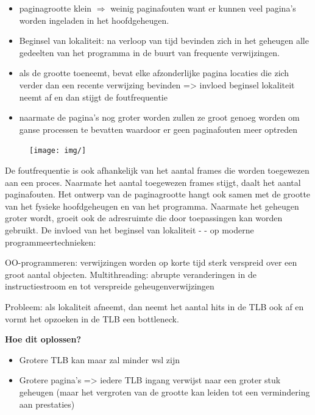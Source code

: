 \begin{itemize}
\item paginagrootte klein $\Rightarrow$ weinig paginafouten want er kunnen veel pagina's worden ingeladen in het hoofdgeheugen.
\item Beginsel van lokaliteit: na verloop van tijd bevinden zich in het geheugen alle gedeelten van het programma in de buurt van frequente verwijzingen.
\item als de grootte toeneemt, bevat elke afzonderlijke pagina locaties die zich verder dan een recente verwijzing bevinden => invloed beginsel lokaliteit neemt af en dan stijgt de foutfrequentie
\item naarmate de pagina's nog groter worden zullen ze groot genoeg worden om ganse processen te bevatten waardoor er geen paginafouten meer optreden
\end{itemize}

\begin{figure}[htp]
    \centering
            \texttt{[image: img/]}
        \caption{}
    \label{fig:}
\end{figure}

De foutfrequentie is ook afhankelijk van het aantal frames die worden toegewezen aan een proces. Naarmate het aantal toegewezen frames stijgt, daalt het aantal paginafouten. Het ontwerp van de paginagrootte hangt ook samen met de grootte van het fysieke hoofdgeheugen en van het programma. Naarmate het geheugen groter wordt, groeit ook de adresruimte die door toepassingen kan worden gebruikt. De invloed van het beginsel van lokaliteit - - op moderne programmeertechnieken:

OO-programmeren: verwijzingen worden op korte tijd sterk verspreid over een groot aantal objecten. Multithreading: abrupte veranderingen in de instructiestroom en tot verspreide geheugenverwijzingen

Probleem: als lokaliteit afneemt, dan neemt het aantal hits in de TLB ook af en vormt het opzoeken in de TLB een bottleneck.

\textbf{Hoe dit oplossen?}

\begin{itemize}
\item Grotere TLB kan maar zal minder wsl zijn
\item Grotere pagina's => iedere TLB ingang verwijst naar een groter stuk geheugen (maar het vergroten van de grootte kan leiden tot een vermindering aan prestaties)
\end{itemize}

